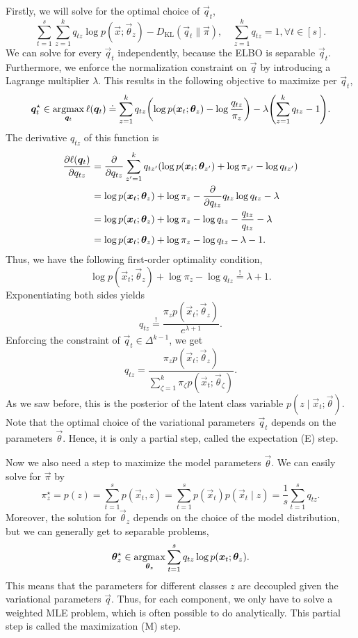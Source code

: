 Firstly, we will solve for the optimal choice of $\vec{q}_t$, \[
    \sum_{t=1}^{s} \sum_{z=1}^{k} q_{tz} \log p(\vec{x}; \vec{\theta}_z) - D_{\mathrm{KL}}(\vec{q}_t \| \vec{\pi}), \quad \sum_{z=1}^{k} q_{tz} = 1, \forall t \in [s].
\]
We can solve for every $\vec{q}_t$ independently, because the ELBO is separable \wrt $\vec{q}_t$.
Furthermore, we enforce the normalization constraint on $\vec{q}$ by introducing a Lagrange
multiplier $\lambda$. This results in the following objective to maximize per $\vec{q}_t$, \[
    \vec{q}_t^\star \in \argmax_{\vec{q}_t} \ell(\vec{q}_t) \doteq \sum_{z=1}^{k} q_{tz} \lft( \log p(\vec{x}_t; \vec{\theta}_z) - \log \frac{q_{tz}}{\pi_z} \rgt) - \lambda \lft( \sum_{z=1}^{k} q_{tz} - 1 \rgt).
\]
The derivative \wrt $q_{tz}$ of this function is
\begin{align*}
    \pdv{\ell(\vec{q}_t)}{q_{tz}} & = \pdv*{\sum_{z'=1}^{k} q_{tz'} \lft( \log p(\vec{x}_t; \vec{\theta}_{z'}) + \log \pi_{z'} - \log q_{tz'} \rgt)}{q_{tz}} \\
                                  & = \log p(\vec{x}_t; \vec{\theta}_z) + \log \pi_z - \pdv*{q_{tz} \log q_{tz}}{q_{tz}} - \lambda                           \\
                                  & = \log p(\vec{x}_t; \vec{\theta}_z) + \log \pi_z - \log q_{tz} - \frac{q_{tz}}{q_{tz}} - \lambda                         \\
                                  & = \log p(\vec{x}_t; \vec{\theta}_z) + \log \pi_z - \log q_{tz} - \lambda - 1.
\end{align*}
Thus, we have the following first-order optimality condition, \[
    \log p(\vec{x}_t; \vec{\theta}_z) + \log \pi_z - \log q_{tz} \overset{!}{=} \lambda + 1.
\]
Exponentiating both sides yields \[
    q_{tz} \overset{!}{=} \frac{\pi_z p(\vec{x}_t; \vec{\theta}_z)}{e^{\lambda+1}}.
\]
Enforcing the constraint of $\vec{q}_t \in \Delta^{k-1}$, we get \[
    q_{tz} = \frac{\pi_z p(\vec{x}_t; \vec{\theta}_z)}{\sum_{\zeta=1}^{k} \pi_{\zeta}p(\vec{x}_t; \vec{\theta}_{\zeta})}.
\]
As we saw before, this is the posterior of the latent class variable $p(z \mid \vec{x}_t;
    \vec{\theta})$. Note that the optimal choice of the variational parameters $\vec{q}_t$ depends on
the parameters $\vec{\theta}$. Hence, it is only a partial step, called the expectation (E) step.

Now we also need a step to maximize the model parameters $\vec{\theta}$. We can easily solve for
$\vec{\pi}$ by \[
    \pi^{\star}_z = p(z) = \sum_{t=1}^{s} p(\vec{x}_t, z) = \sum_{t=1}^{s} p(\vec{x}_t) p(\vec{x}_t \mid z) = \frac{1}{s} \sum_{t=1}^{s} q_{tz}.
\]
Moreover, the solution for $\vec{\theta}_z$ depends on the choice of the model distribution, but we
can generally get to separable problems, \[
    \bm{\theta}^{\star}_z \in \operatorname*{argmax}_{\bm{\theta}_z} \sum_{t=1}^{s} q_{tz} \log p(\bm{x}_t; \bm{\theta}_z).
\]
This means that the parameters for different classes $z$ are decoupled given the variational
parameters $\vec{q}$. Thus, for each component, we only have to solve a weighted MLE problem, which
is often possible to do analytically. This partial step is called the maximization (M) step.

